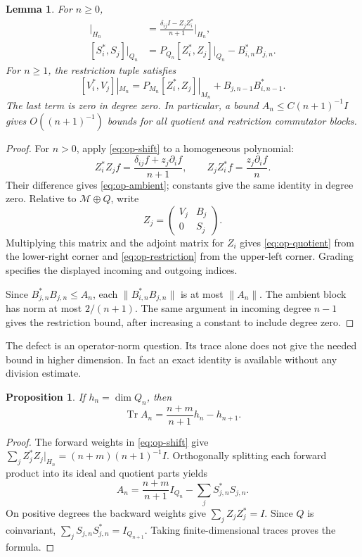 \documentclass[11pt,reqno]{amsart}
\numberwithin{equation}{section}
\newtheorem{lemma}[theorem]{Lemma}
\newtheorem{proposition}[theorem]{Proposition}
\theoremstyle{definition}
\theoremstyle{remark}
\DeclareMathOperator{\Tr}{Tr}
\begin{document}
\begin{lemma}\label{op:commutators}
For $n\ge0$,
\begin{align}
 [Z_i^*,Z_j]|_{H_n}
   &=\frac{\delta_{ij}I-Z_jZ_i^*}{n+1}\bigg|_{H_n},
       \label{eq:op-ambient}\\
 [S_i^*,S_j]|_{Q_n}
   &=P_{Q_n}[Z_i^*,Z_j]|_{Q_n}-B_{i,n}^*B_{j,n}.
       \label{eq:op-quotient}
\end{align}
For $n\ge1$, the restriction tuple satisfies
\begin{equation}\label{eq:op-restriction}
 [V_i^*,V_j]|_{M_n}
 =P_{M_n}[Z_i^*,Z_j]|_{M_n}+B_{j,n-1}B_{i,n-1}^*.
\end{equation}
The last term is zero in degree zero.  In particular, a bound
$A_n\le C(n+1)^{-1}I$ gives $O((n+1)^{-1})$ bounds for all
quotient and restriction commutator blocks.
\end{lemma}
\begin{proof}
For $n>0$, apply \eqref{eq:op-shift} to a homogeneous polynomial:
\[
 Z_i^*Z_jf=\frac{\delta_{ij}f+z_j\partial_if}{n+1},\qquad
 Z_jZ_i^*f=\frac{z_j\partial_if}{n}.
\]
Their difference gives \eqref{eq:op-ambient}; constants give the same
identity in degree zero.  Relative to $\mathcal M\oplus Q$, write
\[
 Z_j=\begin{pmatrix}V_j&B_j\\0&S_j\end{pmatrix}.
\]
Multiplying this matrix and the adjoint matrix for $Z_i$ gives
\eqref{eq:op-quotient} from the lower-right corner and
\eqref{eq:op-restriction} from the upper-left corner.  Grading specifies
the displayed incoming and outgoing indices.

Since $B_{j,n}^*B_{j,n}\le A_n$, each
$\|B_{i,n}^*B_{j,n}\|$ is at most $\|A_n\|$.  The ambient block
has norm at most $2/(n+1)$.  The same argument in incoming degree
$n-1$ gives the restriction bound, after increasing a constant to include
degree zero.
\end{proof}

The defect is an operator-norm question.  Its trace alone does not give
the needed bound in higher dimension.  In fact an exact identity is
available without any division estimate.

\begin{proposition}\label{op:trace}
If $h_n=\dim Q_n$, then
\begin{equation}\label{eq:op-trace}
 \Tr A_n=\frac{n+m}{n+1}h_n-h_{n+1}.
\end{equation}
\end{proposition}
\begin{proof}
The forward weights in \eqref{eq:op-shift} give
$\sum_jZ_j^*Z_j|_{H_n}=(n+m)(n+1)^{-1}I$.
Orthogonally splitting each forward product into its ideal and quotient
parts yields
\[
 A_n=\frac{n+m}{n+1}I_{Q_n}-\sum_j S_{j,n}^*S_{j,n}.
\]
On positive degrees the backward weights give
$\sum_jZ_jZ_j^*=I$.  Since $Q$ is coinvariant,
$\sum_jS_{j,n}S_{j,n}^*=I_{Q_{n+1}}$.  Taking finite-dimensional
traces proves the formula.
\end{proof}
\end{document}
